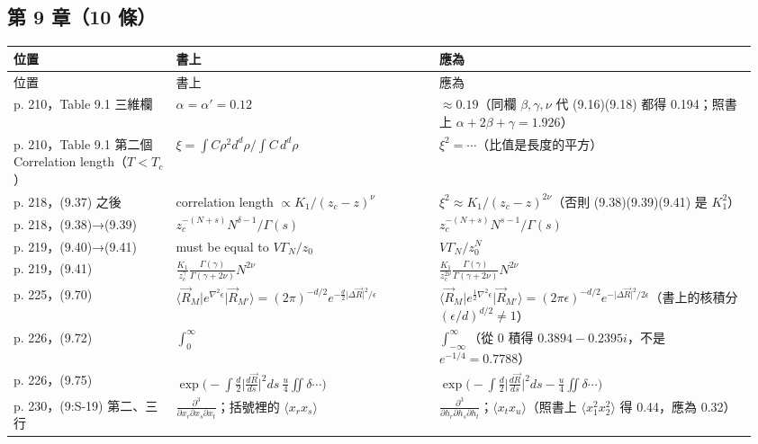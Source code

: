 \subsection{第 9 章（10 條）}
{\footnotesize\renewcommand{\arraystretch}{1.1}\setlength{\tabcolsep}{4pt}
\begin{longtable}{@{}>{\raggedright\arraybackslash}p{0.21\linewidth}>{\raggedright\arraybackslash}p{0.34\linewidth}>{\raggedright\arraybackslash}p{0.41\linewidth}@{}}
\toprule 位置 & 書上 & 應為\\ \midrule\endfirsthead
\toprule 位置 & 書上 & 應為\\ \midrule\endhead
\bottomrule\endfoot
p. 210，Table 9.1 三維欄 & $\alpha=\alpha'=0.12$ & $\approx0.19$（同欄 $\beta,\gamma,\nu$ 代 (9.16)(9.18) 都得 0.194；照書上 $\alpha+2\beta+\gamma=1.926$）\\
p. 210，Table 9.1 第二個 Correlation length（$T<T_c$） & $\xi=\int C\rho^2d^d\rho/\int C\,d^d\rho$ & $\xi^2=\cdots$（比值是長度的平方）\\
p. 218，(9.37) 之後 & correlation length $\propto K_1/(z_c-z)^\nu$ & $\xi^2\approx K_1/(z_c-z)^{2\nu}$（否則 (9.38)(9.39)(9.41) 是 $K_1^2$）\\
p. 218，(9.38)→(9.39) & $z_c^{-(N+s)}N^{\delta-1}/\Gamma(s)$ & $z_c^{-(N+s)}N^{s-1}/\Gamma(s)$\\
p. 219，(9.40)→(9.41) & must be equal to $V\Gamma_N/z_0$ & $V\Gamma_N/z_0^N$\\
p. 219，(9.41) & $\frac{K_1}{z_c^{\gamma}}\frac{\Gamma(\gamma)}{\Gamma(\gamma+2\nu)}N^{2\nu}$ & $\frac{K_1}{z_c^{2\nu}}\frac{\Gamma(\gamma)}{\Gamma(\gamma+2\nu)}N^{2\nu}$\\
p. 225，(9.70) & $\langle\vec R_M\rvert e^{\nabla^2\epsilon}\lvert\vec R_{M'}\rangle=(2\pi)^{-d/2}e^{-\frac d2\lvert\Delta\vec R\rvert^2/\epsilon}$ & $\langle\vec R_M\rvert e^{\frac12\nabla^2\epsilon}\lvert\vec R_{M'}\rangle=(2\pi\epsilon)^{-d/2}e^{-\lvert\Delta\vec R\rvert^2/2\epsilon}$（書上的核積分 $(\epsilon/d)^{d/2}\ne1$）\\
p. 226，(9.72) & $\int_0^\infty$ & $\int_{-\infty}^{\infty}$（從 0 積得 $0.3894-0.2395i$，不是 $e^{-1/4}=0.7788$）\\
p. 226，(9.75) & $\exp\big(-\int\frac d2\lvert\frac{d\vec R}{ds}\rvert^2ds\ \frac u4\iint\delta\cdots\big)$ & $\exp\big(-\int\frac d2\lvert\frac{d\vec R}{ds}\rvert^2ds-\frac u4\iint\delta\cdots\big)$\\
p. 230，(9:S-19) 第二、三行 & $\frac{\partial^3}{\partial x_r\partial x_s\partial x_t}$；括號裡的 $\langle x_rx_s\rangle$ & $\frac{\partial^3}{\partial h_r\partial h_s\partial h_t}$；$\langle x_tx_u\rangle$（照書上 $\langle x_1^2x_2^2\rangle$ 得 0.44，應為 0.32）\\
\end{longtable}}

